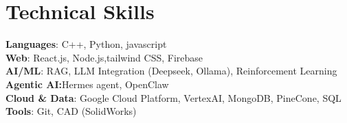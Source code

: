 \documentclass[a4paper,11pt]{article}
\begin{document}
\section{\textbf{Technical Skills}}
 \begin{itemize}[leftmargin=0.1in, label={}]
    \small{\item{
     \textbf{Languages}{: C++, Python, javascript} \\
     \textbf{Web}{: React.js, Node.js,tailwind CSS, Firebase} \\
     \textbf{AI/ML}{: RAG, LLM Integration (Deepseek, Ollama), Reinforcement Learning} \\
     \textbf{Agentic AI:}{Hermes agent, OpenClaw}\\
     \textbf{Cloud \& Data}{: Google Cloud Platform, VertexAI, MongoDB, PineCone, SQL} \\
     \textbf{Tools}{: Git, CAD (SolidWorks)}
    }}
 \end{itemize}

\end{document}
